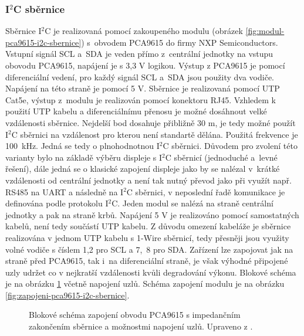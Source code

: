 \subsubsection{I$^2$C sběrnice}
\label{ses:i2c-sbernice}
Sběrnice I$^2$C je realizovaná pomocí zakoupeného modulu (obrázek \ref{fig:modul-pca9615-i2c-sbernice}) s~obvodem PCA9615 do firmy  NXP Semiconductors. Vstupní signál SCL a~SDA je veden přímo z~centrální jednotky na vstupu obovodu PCA9615, napájení je s 3,3 V logikou. Výstup z PCA9615 je pomocí diferenciální vedení, pro každý signál SCL a~SDA jsou použity dva vodiče. Napájení na této straně je pomocí 5 V. Sběrnice je realizovaná pomocí UTP Cat5e, výstup z~modulu je realizován pomocí konektoru RJ45. Vzhledem k použití UTP kabelu a diferenciálnímu přenosu je možné dosáhnout velké vzdálenosti sběrnice. Nejdelší bod dosahuje přibližně 30 m, je tedy možné použít I$^2$C sběrnici na vzdálenost pro kterou není standartě dělána. Použitá frekvence je 100~kHz. Jedná se tedy o plnohodnotnou I$^2$C sběrnici. Důvodem pro zvolení této varianty bylo na základě výběru displeje s I$^2$C sběrnicí (jednoduché a~levné řešení), dále jedná se o klasické zapojení displeje jako by se nalézal v~krátké vzdálenosti od centrální jednotky a není tak nutný převod jako při využít např. RS485 na UART a následně na I$^2$C sběrnici, v neposlední řadě komunikace je definována podle protokolu I$^2$C.  Jeden modul se nalézá na straně centrální jednotky a pak na straně krbů. Napájení 5 V je realizováno pomocí samostatných kabelů, není tedy součástí UTP kabelu. Z důvodu omezení kabeláže je sběrnice realizována v jednom UTP kabelu s 1-Wire sběrnicí, tedy přesněji jsou využity volné vodiče s číslem 1,2 pro SCL a 7,~8 pro SDA. Zařízení lze zapojovat jak na straně před PCA9615, tak i~na diferenciální straně, je však výhodné připojené uzly udržet co v nejkratší vzdálenosti kvůli degradování výkonu. Blokové schéma je na obrázku \ref{fig:blokove-schema-pca9615-i2c-sbernice} včetně napojení uzlů. Schéma zapojení modulu je na obrázku \ref{fig:zapojeni-pca9615-i2c-sbernice}.

\begin{figure}[H]
    \centering
    \def\svgwidth{\columnwidth}
    
    \caption[Blokové schéma zapojení obvodu PCA9615.]{Blokové schéma zapojení obvodu PCA9615 s impedančním zakončením sběrnice a možnostmi napojení uzlů. Upraveno z \cite{pca9615-schema-zapojeni}.}
    \label{fig:blokove-schema-pca9615-i2c-sbernice}
\end{figure}

